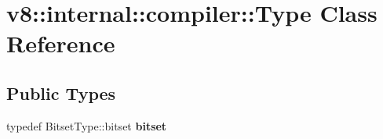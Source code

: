 \hypertarget{classv8_1_1internal_1_1compiler_1_1Type}{}\section{v8\+:\+:internal\+:\+:compiler\+:\+:Type Class Reference}
\label{classv8_1_1internal_1_1compiler_1_1Type}
\subsection*{Public Types}
\begin{DoxyCompactItemize}
\item 
\mbox{\label{classv8_1_1internal_1_1compiler_1_1Type_af793cb2da7add68ad7603e3f49cfa8c2}} 
typedef Bitset\+Type\+::bitset {\bfseries bitset}
\end{DoxyCompactItemize}
